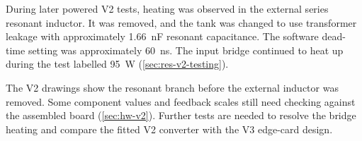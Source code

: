 During later powered V2 tests, heating was observed in the external
series resonant inductor. It was removed, and the tank was changed to use
transformer leakage with approximately \SI{1.66}{\nano\farad} resonant
capacitance. The software dead-time setting was approximately
\SI{60}{\nano\second}. The input bridge continued to heat up during the
test labelled \SI{95}{\watt} (\cref{sec:res-v2-testing}).

The V2 drawings show the resonant branch before the external inductor was
removed. Some component values and feedback scales still need checking
against the assembled board (\cref{sec:hw-v2}). Further tests are needed
to resolve the bridge heating and compare the fitted V2 converter with
the V3 edge-card design.
